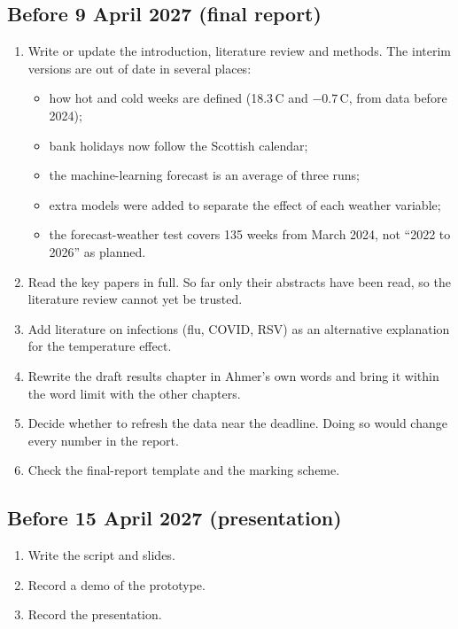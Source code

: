 \documentclass[11pt,a4paper]{article}
\begin{document}
\subsection{Before 9 April 2027 (final report)}
\begin{enumerate}
\item Write or update the introduction, literature review and methods. The interim versions are out of date in several places:
  \begin{itemize}
  \item how hot and cold weeks are defined (18.3\,\textdegree C and $-0.7$\,\textdegree C, from data before 2024);
  \item bank holidays now follow the Scottish calendar;
  \item the machine-learning forecast is an average of three runs;
  \item extra models were added to separate the effect of each weather variable;
  \item the forecast-weather test covers 135 weeks from March 2024, not ``2022 to 2026'' as planned.
  \end{itemize}
\item Read the key papers in full. So far only their abstracts have been read, so the literature review cannot yet be trusted.
\item Add literature on infections (flu, COVID, RSV) as an alternative explanation for the temperature effect.
\item Rewrite the draft results chapter in Ahmer's own words and bring it within the word limit with the other chapters.
\item Decide whether to refresh the data near the deadline. Doing so would change every number in the report.
\item Check the final-report template and the marking scheme.
\end{enumerate}

\subsection{Before 15 April 2027 (presentation)}
\begin{enumerate}
\item Write the script and slides.
\item Record a demo of the prototype.
\item Record the presentation.
\end{enumerate}
\end{document}
